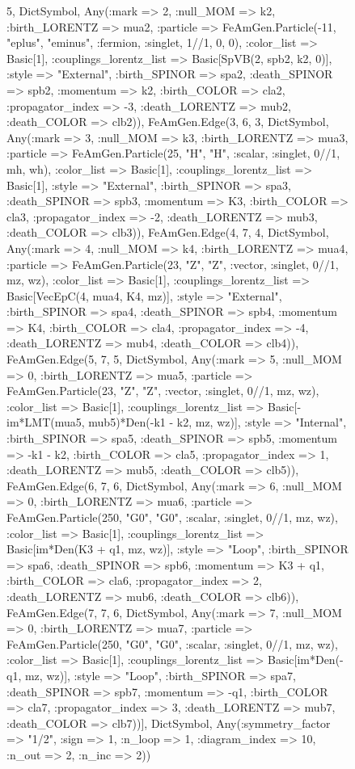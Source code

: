\documentclass{revtex4}
\begin{document}
\begin{figure}[!htb]
\begin{center}
{5, Dict{Symbol, Any}(:mark => 2, :null_MOM => k2, :birth_LORENTZ => mua2, :particle => FeAmGen.Particle(-11, "eplus", "eminus", :fermion, :singlet, 1//1, 0, 0), :color_list => Basic[1], :couplings_lorentz_list => Basic[SpVB(2, spb2, k2, 0)], :style => "External", :birth_SPINOR => spa2, :death_SPINOR => spb2, :momentum => k2, :birth_COLOR => cla2, :propagator_index => -3, :death_LORENTZ => mub2, :death_COLOR => clb2)), FeAmGen.Edge(3, 6, 3, Dict{Symbol, Any}(:mark => 3, :null_MOM => k3, :birth_LORENTZ => mua3, :particle => FeAmGen.Particle(25, "H", "H", :scalar, :singlet, 0//1, mh, wh), :color_list => Basic[1], :couplings_lorentz_list => Basic[1], :style => "External", :birth_SPINOR => spa3, :death_SPINOR => spb3, :momentum => K3, :birth_COLOR => cla3, :propagator_index => -2, :death_LORENTZ => mub3, :death_COLOR => clb3)), FeAmGen.Edge(4, 7, 4, Dict{Symbol, Any}(:mark => 4, :null_MOM => k4, :birth_LORENTZ => mua4, :particle => FeAmGen.Particle(23, "Z", "Z", :vector, :singlet, 0//1, mz, wz), :color_list => Basic[1], :couplings_lorentz_list => Basic[VecEpC(4, mua4, K4, mz)], :style => "External", :birth_SPINOR => spa4, :death_SPINOR => spb4, :momentum => K4, :birth_COLOR => cla4, :propagator_index => -4, :death_LORENTZ => mub4, :death_COLOR => clb4)), FeAmGen.Edge(5, 7, 5, Dict{Symbol, Any}(:mark => 5, :null_MOM => 0, :birth_LORENTZ => mua5, :particle => FeAmGen.Particle(23, "Z", "Z", :vector, :singlet, 0//1, mz, wz), :color_list => Basic[1], :couplings_lorentz_list => Basic[-im*LMT(mua5, mub5)*Den(-k1 - k2, mz, wz)], :style => "Internal", :birth_SPINOR => spa5, :death_SPINOR => spb5, :momentum => -k1 - k2, :birth_COLOR => cla5, :propagator_index => 1, :death_LORENTZ => mub5, :death_COLOR => clb5)), FeAmGen.Edge(6, 7, 6, Dict{Symbol, Any}(:mark => 6, :null_MOM => 0, :birth_LORENTZ => mua6, :particle => FeAmGen.Particle(250, "G0", "G0", :scalar, :singlet, 0//1, mz, wz), :color_list => Basic[1], :couplings_lorentz_list => Basic[im*Den(K3 + q1, mz, wz)], :style => "Loop", :birth_SPINOR => spa6, :death_SPINOR => spb6, :momentum => K3 + q1, :birth_COLOR => cla6, :propagator_index => 2, :death_LORENTZ => mub6, :death_COLOR => clb6)), FeAmGen.Edge(7, 7, 6, Dict{Symbol, Any}(:mark => 7, :null_MOM => 0, :birth_LORENTZ => mua7, :particle => FeAmGen.Particle(250, "G0", "G0", :scalar, :singlet, 0//1, mz, wz), :color_list => Basic[1], :couplings_lorentz_list => Basic[im*Den(-q1, mz, wz)], :style => "Loop", :birth_SPINOR => spa7, :death_SPINOR => spb7, :momentum => -q1, :birth_COLOR => cla7, :propagator_index => 3, :death_LORENTZ => mub7, :death_COLOR => clb7))], Dict{Symbol, Any}(:symmetry_factor => "1/2", :sign => 1, :n_loop => 1, :diagram_index => 10, :n_out => 2, :n_inc => 2)) 
}
\end{center}
\end{figure}
\end{document}
